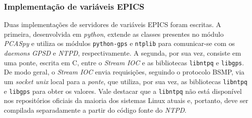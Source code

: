 % 
% 
% 

\subsubsection{Implementação de variáveis EPICS}
\label{sec:pvsgps}

Duas implementações de servidores de variáveis EPICS foram escritas. A primeira,
desenvolvida em \textit{python}, extende as classes presentes no módulo
\textit{PCASpy} e utiliza os módulos \texttt{python-gps} e \texttt{ntplib} para
comunicar-se com os \textit{daemons} \textit{GPSD} e \textit{NTPD},
respectivamente. A segunda, por sua vez, consiste em uma ponte, escrita em C,
entre o \textit{Stream IOC} e as bibliotecas \texttt{libntpq} e \texttt{libgps}.
De modo geral, o \textit{Stream IOC} envia requisições, seguindo o protocolo
BSMP, via um \textit{socket unix} local para a \textit{ponte}, que utiliza, por
sua vez, as bibliotecas \texttt{libntpq} e \texttt{libgps} para obter os valores. Vale
destacar que a \texttt{libntpq} não está disponível nos repositórios oficiais da
maioria dos sistemas Linux atuais e, portanto, deve ser compilada separadamente
a partir do código fonte do \textit{NTPD}.

